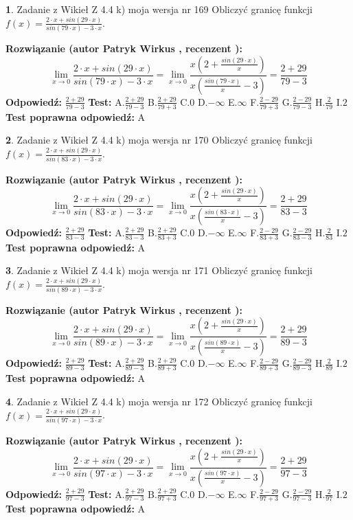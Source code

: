 \documentclass[12pt, a4paper]{article}
\theoremstyle{definition} %
\newtheorem{zad}{}
\newcommand{\zadStart}[1]{\begin{zad}#1\newline}
\newcommand{\zadStop}{\end{zad}}
\newcommand{\rozwStart}[2]{\noindent \textbf{Rozwiązanie (autor #1 , recenzent #2): }\newline}
\newcommand{\rozwStop}{\newline}
\newcommand{\odpStart}{\noindent \textbf{Odpowiedź:}\newline}
\newcommand{\odpStop}{\newline}
\newcommand{\testStart}{\noindent \textbf{Test:}\newline}
\newcommand{\testStop}{\newline}
\newcommand{\kluczStart}{\noindent \textbf{Test poprawna odpowiedź:}\newline}
\newcommand{\kluczStop}{\newline}
\begin{document}
\zadStart{Zadanie z Wikieł Z 4.4 k) moja wersja nr 169}
Obliczyć granicę funkcji $f(x)=\frac{2\cdot x +sin(29\cdot x)}{sin(79\cdot x) -3\cdot x}$.
\zadStop
\rozwStart{Patryk Wirkus}{}
$$\lim\limits_{x\to 0}\frac{2\cdot x +sin(29\cdot x)}{sin(79\cdot x) -3\cdot x}
=\lim\limits_{x\to 0}\frac{x(2+\frac{sin(29\cdot x)}{x})}{x(\frac{sin(79\cdot x)}{x}-3)}
=\frac{2+29}{79-3}$$
\rozwStop
\odpStart
$\frac{2+29}{79-3}$
\odpStop
\testStart
A.$\frac{2+29}{79-3}$
B.$\frac{2+29}{79+3}$
C.$0$
D.$-\infty$
E.$\infty$
F.$\frac{2-29}{79+3}$
G.$\frac{2-29}{79-3}$
H.$\frac{2}{79}$
I.$2$
\testStop
\kluczStart
A
\kluczStop



\zadStart{Zadanie z Wikieł Z 4.4 k) moja wersja nr 170}
Obliczyć granicę funkcji $f(x)=\frac{2\cdot x +sin(29\cdot x)}{sin(83\cdot x) -3\cdot x}$.
\zadStop
\rozwStart{Patryk Wirkus}{}
$$\lim\limits_{x\to 0}\frac{2\cdot x +sin(29\cdot x)}{sin(83\cdot x) -3\cdot x}
=\lim\limits_{x\to 0}\frac{x(2+\frac{sin(29\cdot x)}{x})}{x(\frac{sin(83\cdot x)}{x}-3)}
=\frac{2+29}{83-3}$$
\rozwStop
\odpStart
$\frac{2+29}{83-3}$
\odpStop
\testStart
A.$\frac{2+29}{83-3}$
B.$\frac{2+29}{83+3}$
C.$0$
D.$-\infty$
E.$\infty$
F.$\frac{2-29}{83+3}$
G.$\frac{2-29}{83-3}$
H.$\frac{2}{83}$
I.$2$
\testStop
\kluczStart
A
\kluczStop



\zadStart{Zadanie z Wikieł Z 4.4 k) moja wersja nr 171}
Obliczyć granicę funkcji $f(x)=\frac{2\cdot x +sin(29\cdot x)}{sin(89\cdot x) -3\cdot x}$.
\zadStop
\rozwStart{Patryk Wirkus}{}
$$\lim\limits_{x\to 0}\frac{2\cdot x +sin(29\cdot x)}{sin(89\cdot x) -3\cdot x}
=\lim\limits_{x\to 0}\frac{x(2+\frac{sin(29\cdot x)}{x})}{x(\frac{sin(89\cdot x)}{x}-3)}
=\frac{2+29}{89-3}$$
\rozwStop
\odpStart
$\frac{2+29}{89-3}$
\odpStop
\testStart
A.$\frac{2+29}{89-3}$
B.$\frac{2+29}{89+3}$
C.$0$
D.$-\infty$
E.$\infty$
F.$\frac{2-29}{89+3}$
G.$\frac{2-29}{89-3}$
H.$\frac{2}{89}$
I.$2$
\testStop
\kluczStart
A
\kluczStop



\zadStart{Zadanie z Wikieł Z 4.4 k) moja wersja nr 172}
Obliczyć granicę funkcji $f(x)=\frac{2\cdot x +sin(29\cdot x)}{sin(97\cdot x) -3\cdot x}$.
\zadStop
\rozwStart{Patryk Wirkus}{}
$$\lim\limits_{x\to 0}\frac{2\cdot x +sin(29\cdot x)}{sin(97\cdot x) -3\cdot x}
=\lim\limits_{x\to 0}\frac{x(2+\frac{sin(29\cdot x)}{x})}{x(\frac{sin(97\cdot x)}{x}-3)}
=\frac{2+29}{97-3}$$
\rozwStop
\odpStart
$\frac{2+29}{97-3}$
\odpStop
\testStart
A.$\frac{2+29}{97-3}$
B.$\frac{2+29}{97+3}$
C.$0$
D.$-\infty$
E.$\infty$
F.$\frac{2-29}{97+3}$
G.$\frac{2-29}{97-3}$
H.$\frac{2}{97}$
I.$2$
\testStop
\kluczStart
A
\kluczStop
\end{document}
